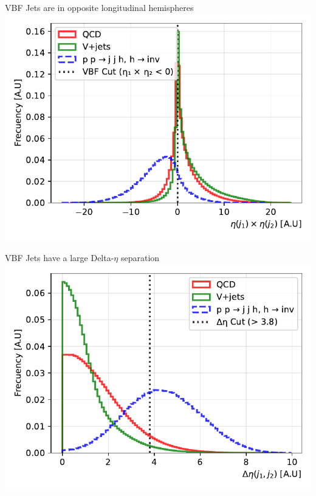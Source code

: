 \documentclass{../../bredelebeamer}
\begin{document}
\begin{frame}{VBF Jets are in opposite longitudinal hemispheres}
    \includegraphics[width=\textwidth]{../Images/eta_product_comparison.pdf}
\end{frame}

\begin{frame}{VBF Jets have a large Delta-$\eta$ separation}
    \includegraphics[width=\textwidth]{../Images/delta_eta_comparison.pdf}
\end{frame}
\end{document}
